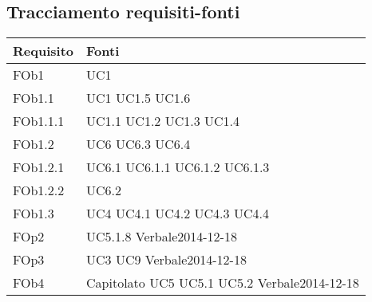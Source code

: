 \newpage
\subsection{ Tracciamento requisiti-fonti}
	
\begin{longtable}{|l|p{4cm}|}
\hline
\textbf{Requisito} & \textbf{Fonti} \\
\hline
FOb1 & UC1 \linebreak \\ 
\hline
FOb1.1 & UC1 \linebreak  UC1.5 \linebreak  UC1.6 \linebreak  \\ 
\hline
FOb1.1.1 & UC1.1 \linebreak  UC1.2 \linebreak  UC1.3 \linebreak  UC1.4 \linebreak  \\ 
\hline
FOb1.2 & UC6 \linebreak  UC6.3 \linebreak  UC6.4 \linebreak  \\ 
\hline
FOb1.2.1 & UC6.1 \linebreak  UC6.1.1 \linebreak  UC6.1.2 \linebreak  UC6.1.3 \linebreak  \\ 
\hline
FOb1.2.2 & UC6.2 \linebreak  \\ 
\hline
FOb1.3 & UC4 \linebreak  UC4.1 \linebreak  UC4.2 \linebreak  UC4.3 \linebreak  UC4.4 \linebreak  \\ 
\hline
FOp2 & UC5.1.8 \linebreak Verbale2014-12-18 \linebreak \\ 
\hline
FOp3 & UC3 \linebreak UC9 \linebreak Verbale2014-12-18 \linebreak \\ 
\hline
FOb4 & Capitolato \linebreak UC5 \linebreak UC5.1 \linebreak UC5.2 \linebreak Verbale2014-12-18 \linebreak \\ 

\end{longtable}
